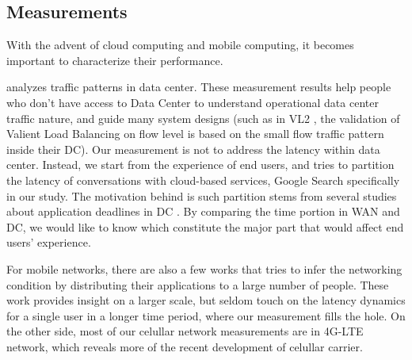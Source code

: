 \subsection{Measurements}
\label{sec:measurements}

With the advent of cloud computing and mobile computing, it becomes important to characterize their performance. 

\cite{benson2010network, kandula2009nature} analyzes traffic patterns in data center. These measurement results help people who don't have access to Data Center to understand operational data center traffic nature, and guide many system designs (such as in VL2 \cite{greenberg2009vl2}, the validation of Valient Load Balancing on flow level is based on the small flow traffic pattern inside their DC). Our measurement is not to address the latency within data center. Instead, we start from the experience of end users, and tries to partition the latency of conversations with cloud-based services, Google Search specifically in our study. The motivation behind is such partition stems from several studies about application deadlines in DC \cite{wilson2011better}. By comparing the time portion in WAN and DC, we would like to know which constitute the major part that would affect end users' experience.

For mobile networks, there are also a few works \cite{xu2011cellular, huang2011mobiperf} that tries to infer the networking condition by distributing their applications to a large number of people. These work provides insight on a larger scale, but seldom touch on the latency dynamics for a single user in a longer time period, where our measurement fills the hole. On the other side, most of our celullar network measurements are in 4G-LTE network, which reveals more of the recent development of celullar carrier.




